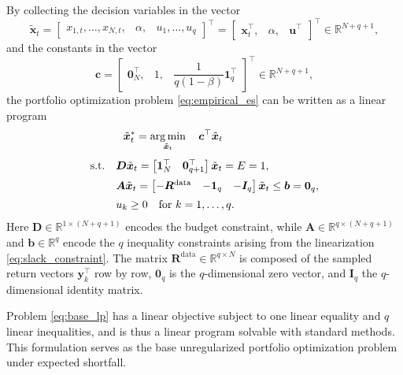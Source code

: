 By collecting the decision variables in the vector
\begin{equation*}
    \tilde{\bm{x}}_t = \begin{bmatrix} x_{1,t}, \dots, x_{N,t}, &  \alpha, & u_1, \dots, u_q \end{bmatrix}^\top
    = \begin{bmatrix} \bm{x}_t^\top, & \alpha, & \bm{u}^\top \end{bmatrix}^\top \in \mathbb{R}^{N+q+1},
\end{equation*}
and the constants in the vector
\begin{equation*}
    \bm{c} = \begin{bmatrix} \bm{0}_N^\top, &  1, & \dfrac{1}{q(1-\beta)} \bm{1}_q^\top \end{bmatrix}^\top \in \mathbb{R}^{N+q+1},
\end{equation*}
the portfolio optimization problem \eqref{eq:empirical_es} can be written as a linear program
\begin{equation} \label{eq:base_lp}
\begin{aligned}
    & \ \ \tilde{\bm{x}}_t^* = \operatorname*{arg\,min}_{\tilde{\bm{x}}_t} \quad
     \bm{c}^\top \tilde{\bm{x}}_t \\[4pt]
    \text{s.t.} \quad
    & \bm{D} \tilde{\bm{x}}_t =
    \begin{bmatrix} \bm{1}_N^\top & \bm{0}_{q+1}^\top \end{bmatrix}
    \tilde{\bm{x}}_t = E = 1, \\[2pt]
    & \bm{A} \tilde{\bm{x}}_t =
    \begin{bmatrix} -\bm{R}^{\text{data}} & -\bm{1}_q & -\bm{I}_q \end{bmatrix}
    \tilde{\bm{x}}_t \le \bm{b} = \bm{0}_q, \\[2pt]
    & u_k \ge 0 \quad \text{for } k = 1, \dots, q.
\end{aligned}
\end{equation}
Here $\bm{D} \in \mathbb{R}^{1 \times (N+q+1)}$ encodes the budget constraint, while
$\bm{A} \in \mathbb{R}^{q \times (N+q+1)}$ and $\bm{b} \in \mathbb{R}^{q}$ encode the
$q$ inequality constraints arising from the linearization \eqref{eq:slack_constraint}. The matrix
$\bm{R}^{\text{data}} \in \mathbb{R}^{q \times N}$ is composed of the sampled return vectors $\bm{y}_k^\top$ row by
row, $\bm{0}_q$ is the $q$-dimensional zero vector, and $\bm{I}_q$ the $q$-dimensional identity matrix.

Problem \eqref{eq:base_lp} has a linear objective subject to one linear equality and $q$
linear inequalities, and is thus a linear program solvable with standard methods. This
formulation serves as the base unregularized portfolio optimization problem under expected shortfall.

